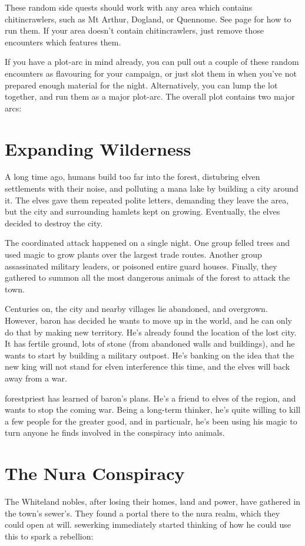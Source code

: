 These random side quests should work with any area which contains chitincrawlers, such as Mt Arthur, Dogland, or Quennome.  See page \pageref{sidequests} for how to run them.  If your area doesn't contain chitincrawlers, just remove those encounters which features them.

If you have a plot-arc in mind already, you can pull out a couple of these random encounters as flavouring for your campaign, or just slot them in when you've not prepared enough material for the night.  Alternatively, you can lump the lot together, and run them as a major plot-arc.  The overall plot contains two major arcs:

\section{Expanding Wilderness}
A long time ago, humans build too far into the forest, distubring elven settlements with their noise, and polluting a mana lake by building a city around it.  The elves gave them repeated polite letters, demanding they leave the area, but the city and surrounding hamlets kept on growing.  Eventually, the elves decided to destroy the city.

The coordinated attack happened on a single night.  One group felled trees and used magic to grow plants over the largest trade routes.  Another group assassinated military leaders, or poisoned entire guard houses.  Finally, they gathered to summon all the most dangerous animals of the forest to attack the town.

Centuries on, the city and nearby villages lie abandoned, and overgrown.  However, \gls{baron} has decided he wants to move up in the world, and he can only do that by making new territory.  He's already found the location of the lost city.  It has fertile ground, lots of stone (from abandoned walls and buildings), and he wants to start by building a military outpost.  He's banking on the idea that the new king will not stand for elven interference this time, and the elves will back away from a war.


\gls{forestpriest} has learned of \gls{baron}'s plans.  He's a friend to elves of the region, and wants to stop the coming war.  Being a long-term thinker, he's quite willing to kill a few people for the greater good, and in particualr, he's been using his magic to turn anyone he finds involved in the conspiracy into animals.

\section{The Nura Conspiracy}
The Whiteland nobles, after losing their homes, land and power, have gathered in the town's sewer's.  They found a portal there to the nura realm, which they could open at will.  \gls{sewerking} immediately started thinking of how he could use this to spark a rebellion:

